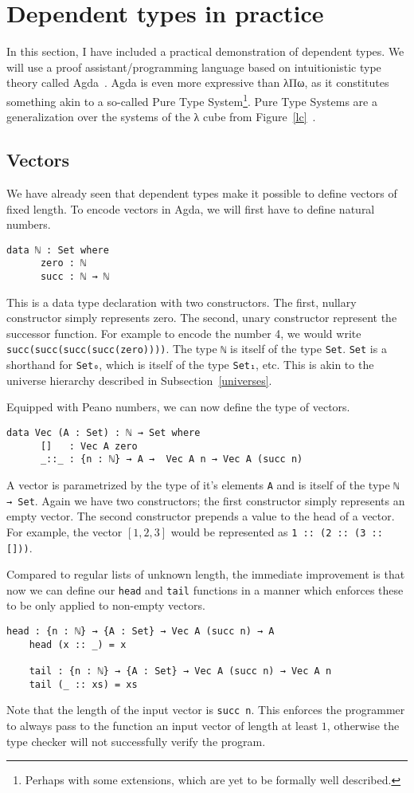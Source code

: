 \documentclass[12pt]{article}
\begin{document}
\section{Dependent types in practice}
In this section, I have included a practical demonstration of dependent types. We will use a proof assistant/programming language based on intuitionistic type theory called Agda~\cite{norell2007towards}. Agda is even more expressive than λΠω, as it constitutes something akin to a so-called Pure Type System\footnote{Perhaps with some extensions, which are yet to be formally well described.}. Pure Type Systems are a generalization over the systems of the λ cube from Figure~\ref{lc}~\cite{sorensen2006lectures}.

\subsection{Vectors}
We have already seen that dependent types make it possible to define vectors of fixed length. To encode vectors in Agda, we will first have to define natural numbers.
\begin{Verbatim}[samepage=true]
    data ℕ : Set where
      zero : ℕ 
      succ : ℕ → ℕ
\end{Verbatim}
This is a data type declaration with two constructors. The first, nullary constructor simply represents zero. The second, unary constructor represent the successor function. For example to encode the number 4, we would write \verb|succ(succ(succ(succ(zero))))|.
The type \verb|ℕ| is itself of the type \verb|Set|. \verb|Set| is a shorthand for \verb|Set₀|, which is itself of the type \verb|Set₁|, etc. This is akin to the universe hierarchy described in Subsection~\ref{universes}.

Equipped with Peano numbers, we can now define the type of vectors.
\begin{Verbatim}[samepage=true]
    data Vec (A : Set) : ℕ → Set where
      []   : Vec A zero
      _::_ : {n : ℕ} → A →  Vec A n → Vec A (succ n)
\end{Verbatim}
A vector is parametrized by the type of it's elements \verb|A| and is itself of the type \verb|ℕ → Set|. Again we have two constructors; the first constructor simply represents an empty vector. The second constructor prepends a value to the head of a vector. For example, the vector $[1, 2, 3]$ would be represented as \verb|1 :: (2 :: (3 :: []))|.

Compared to regular lists of unknown length, the immediate improvement is that now we can define our \verb|head| and \verb|tail| functions in a manner which enforces these to be only applied to non-empty vectors.
\begin{Verbatim}[samepage=true]
    head : {n : ℕ} → {A : Set} → Vec A (succ n) → A
    head (x :: _) = x

    tail : {n : ℕ} → {A : Set} → Vec A (succ n) → Vec A n
    tail (_ :: xs) = xs
\end{Verbatim}
Note that the length of the input vector is \verb|succ n|. This enforces the programmer to always pass to the function an input vector of length at least $1$, otherwise the type checker will not successfully verify the program.
\end{document}
